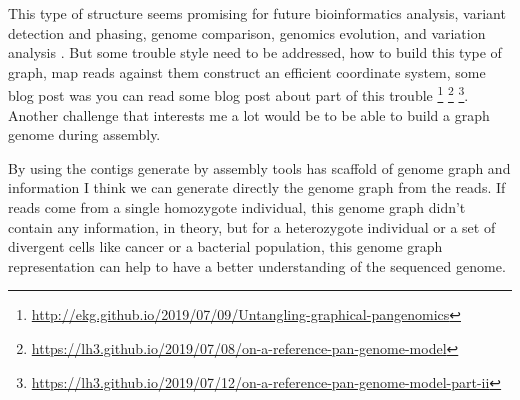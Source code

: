 \documentclass[main.tex]{subfiles}
\begin{document}
This type of structure seems promising for future bioinformatics analysis, variant detection and phasing, genome comparison,  genomics evolution, and variation analysis \cite{goodbye_ref_hello_graphs}. But some trouble style need to be addressed, how to build this type of graph, map reads against them construct an efficient coordinate system, some blog post was you can read some blog post about part of this trouble \footnote{\url{http://ekg.github.io/2019/07/09/Untangling-graphical-pangenomics}} \footnote{\url{https://lh3.github.io/2019/07/08/on-a-reference-pan-genome-model}} \footnote{\url{https://lh3.github.io/2019/07/12/on-a-reference-pan-genome-model-part-ii}}. Another challenge that interests me a lot would be to be able to build a graph genome during assembly.

By using the contigs generate by assembly tools has scaffold of genome graph and \knot \OLC information I think we can generate directly the genome graph from the reads. If reads come from a single homozygote individual, this genome graph didn't contain any information, in theory, but for a heterozygote individual or a set of divergent cells like cancer or a bacterial population, this genome graph representation can help to have a better understanding of the sequenced genome.

\end{document}
